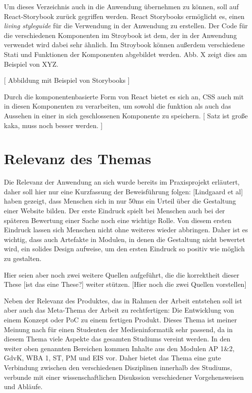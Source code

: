 Um dieses Verzeichnis auch in die Anwendung übernehmen zu können, soll auf React-Storybook zurück gegriffen werden. React Storybooks ermöglicht es, einen \textit{living styleguide} für die Verwendung in der Anwendung zu erstellen. Der Code für die verschiedenen Komponenten im Stroybook ist dem, der in der Anwendung verwendet wird dabei sehr ähnlich. Im Stroybook können außerdem verschiedene Stati und Funktionen der Komponenten abgebildet werden. Abb. X zeigt dies am Beispiel von XYZ.

[ Abbildung mit Beispiel von Storybooks ]

Durch die komponentenbasierte Form von React bietet es sich an, CSS auch mit in diesen Komponenten zu verarbeiten, um sowohl die funktion als auch das Aussehen in einer in sich geschlossenen Komponente zu speichern. [ Satz ist große kaka, muss noch besser werden. ]


\section{Relevanz des Themas}
Die Relevanz der Anwendung an sich wurde bereits im Praxisprojekt erläutert, daher soll hier nur eine Kurzfassung der Beweisführung folgen:
[Lindgaard et al] haben gezeigt, dass Menschen sich in nur 50ms ein Urteil über die Gestaltung einer Website bilden. Der erste Eindruck spielt bei Menschen auch bei der späteren Bewertung einer Sache noch eine wichtige Rolle.  Von diesem ersten Eindruck lassen sich Menschen nicht ohne weiteres wieder abbringen.
Daher ist es wichtig, dass auch Artefakte in Modulen, in denen die Gestaltung nicht bewertet wird, ein solides Design aufweise, um den ersten Eindruck so positiv wie möglich zu gestalten.

Hier seien aber noch zwei weitere Quellen aufgeführt, die die korrektheit dieser These [ist das eine These?] weiter stützen.
[Hier noch die zwei Quellen vorstellen]

Neben der Relevanz des Produktes, das in Rahmen der Arbeit entstehen soll ist aber auch das Meta-Thema der Arbeit zu rechtfertigen: Die Entwicklung von einem Konzept oder PoC zu einem fertigen Produkt.
Dieses Thema ist meiner Meinung nach für einen Studenten der Medieninformatik sehr passend, da in diesem Thema viele Aspekte das gesamten Studiums vereint werden. In den weiter oben genannten Bereichen kommen Inhalte aus den Modulen AP 1\&2, GdvK, WBA 1, ST,  PM und EIS vor. Daher bietet das Thema eine gute Verbindung zwischen den verschiedenen Disziplinen innerhalb des Studiums, verbunde mit einer wissenschaftlichen Disukssion verschiedener Vorgehensweisen und Abläufe.


